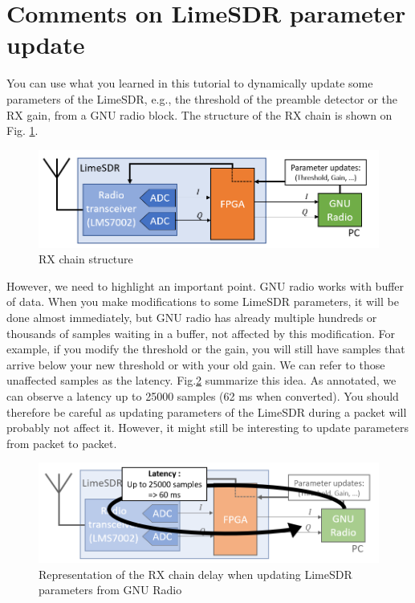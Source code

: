 \section{Comments on LimeSDR parameter update}

You can use what you learned in this tutorial to dynamically update some parameters of the LimeSDR, e.g., the threshold of the preamble detector or the RX gain, from a GNU radio block. The structure of the RX chain is shown on Fig. \ref{fig:Structure}.

 \begin{figure}[H]
    \centering
    \includegraphics[scale=0.8]{figures/Structure.png}
    \caption{RX chain structure}
    \label{fig:Structure}
\end{figure}

However, we need to highlight an important point. GNU radio works with buffer of data. When you make modifications to some LimeSDR parameters, it will be done almost immediately, but GNU radio has already multiple hundreds or thousands of samples waiting in a buffer, not affected by this modification. For example, if you modify the threshold or the gain, you will still have samples that arrive below your new threshold or with your old gain. We can refer to those unaffected samples as the latency. Fig.\ref{fig:Structure_delay} summarize this idea. As annotated, we can observe a latency up to 25000 samples (62 ms when converted).  You should therefore be careful as updating parameters of the LimeSDR during a packet will probably not affect it. However, it might still be interesting to update parameters from packet to packet.

 \begin{figure}[H]
    \centering
    \includegraphics[scale=0.8]{figures/Structure_delay.png}
    \caption{Representation of the RX chain delay when updating LimeSDR parameters from GNU Radio}
    \label{fig:Structure_delay}
\end{figure}




